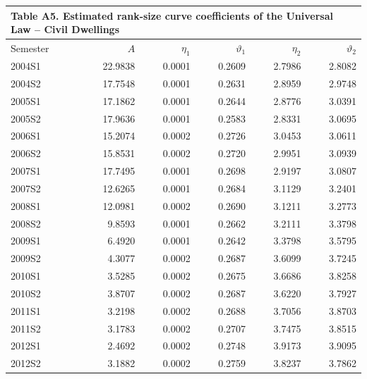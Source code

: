 
\clearpage
\begin{landscape}
\begin{table}[!ht]
  \centering
  \footnotesize
  \setlength{\tabcolsep}{4pt}
  \renewcommand{\arraystretch}{0.80}
  \begin{tabular}{lrrrrr}
    \multicolumn{6}{l}{\small\textbf{Table A5. Estimated rank-size curve coefficients of the Universal Law -- Civil Dwellings}} \\[3pt]
    \hline
    Semester & $A$ & $\eta_{1}$ & $\vartheta_{1}$ & $\eta_{2}$ & $\vartheta_{2}$ \\
    \hline
    2004S1 & 22.9838 & 0.0001 & 0.2609 & 2.7986 & 2.8082 \\
    2004S2 & 17.7548 & 0.0001 & 0.2631 & 2.8959 & 2.9748 \\
    2005S1 & 17.1862 & 0.0001 & 0.2644 & 2.8776 & 3.0391 \\
    2005S2 & 17.9636 & 0.0001 & 0.2583 & 2.8331 & 3.0695 \\
    2006S1 & 15.2074 & 0.0002 & 0.2726 & 3.0453 & 3.0611 \\
    2006S2 & 15.8531 & 0.0002 & 0.2720 & 2.9951 & 3.0939 \\
    2007S1 & 17.7495 & 0.0001 & 0.2698 & 2.9197 & 3.0807 \\
    2007S2 & 12.6265 & 0.0001 & 0.2684 & 3.1129 & 3.2401 \\
    2008S1 & 12.0981 & 0.0002 & 0.2690 & 3.1211 & 3.2773 \\
    2008S2 &  9.8593 & 0.0001 & 0.2662 & 3.2111 & 3.3798 \\
    2009S1 &  6.4920 & 0.0001 & 0.2642 & 3.3798 & 3.5795 \\
    2009S2 &  4.3077 & 0.0002 & 0.2687 & 3.6099 & 3.7245 \\
    2010S1 &  3.5285 & 0.0002 & 0.2675 & 3.6686 & 3.8258 \\
    2010S2 &  3.8707 & 0.0002 & 0.2687 & 3.6220 & 3.7927 \\
    2011S1 &  3.2198 & 0.0002 & 0.2688 & 3.7056 & 3.8703 \\
    2011S2 &  3.1783 & 0.0002 & 0.2707 & 3.7475 & 3.8515 \\
    2012S1 &  2.4692 & 0.0002 & 0.2748 & 3.9173 & 3.9095 \\
    2012S2 &  3.1882 & 0.0002 & 0.2759 & 3.8237 & 3.7862 \\

\end{tabular}
\end{table}
\end{landscape}
